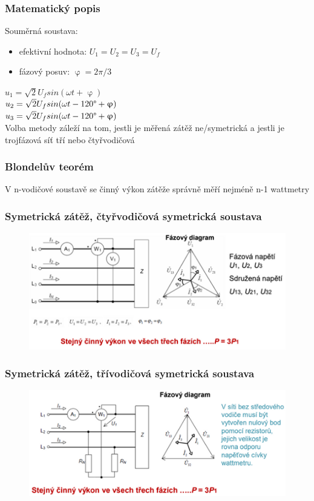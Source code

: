 \subsubsection*{Matematický popis}
Souměrná soustava:
\begin{itemize}
    \item efektivní hodnota: $U_1 = U_2 = U_3 = U_f$
    \item fázový posuv: $\upvarphi = 2\pi /3$
\end{itemize}
$u_1 = \sqrt{2}U_fsin(\omega t +\upvarphi)$\\
$u_2 = \sqrt{2}U_fsin(\omega t -120\degree +\upvarphi)$\\
$u_3 = \sqrt{2}U_fsin(\omega t -120\degree +\upvarphi)$\\


Volba  metody záleží na tom, jestli je měřená zátěž ne/symetrická a jestli je trojfázová síť tří nebo čtyřvodičová\\

\subsubsection*{Blondelův teorém}
V n-vodičové soustavě se činný výkon zátěže správně měří nejméně n-1 wattmetry

\subsubsection*{Symetrická zátěž, čtyřvodičová symetrická soustava}
\begin{figure}[H]
    \includegraphics*[scale = 1.2]{images/sym_4_sym.png}
\end{figure}


\subsubsection*{Symetrická zátěž, třívodičová symetrická soustava}
\begin{figure}[H]
    \includegraphics*[scale = 1.2]{images/sym_3_sym.png}
\end{figure}


